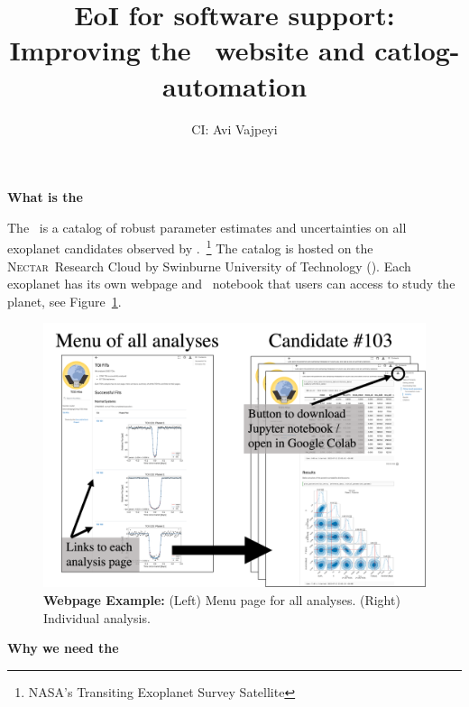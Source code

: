 \documentclass[floatfix,onecolumn]{aastex631}
\newcommand{\nectar}{\textsc{Nectar}}
\begin{document}
\title{\large\textbf{EoI for software support}:\\Improving the \tessAtlas\ website and catlog-automation}
 

\author{CI: Avi Vajpeyi}
\affiliation{\SPA}

\section*{}
\large{\textbf{What is the \tessAtlas}}\hfill\vspace{0.3em}

The \tessAtlas\ is a catalog of robust parameter estimates and uncertainties on all exoplanet candidates observed by \tess.~\footnote{NASA's Transiting Exoplanet Survey Satellite}
The catalog is hosted on the \nectar\ Research Cloud by Swinburne University of Technology (\atlasUrl). Each exoplanet has its own webpage and \jupyter\ notebook that users can access to study the planet, see Figure~\ref{fig:demo}.

\begin{figure}
    \includegraphics[width=\linewidth]{figures/notebooks_screenshot.png}
    \caption{\textbf{Webpage Example:} (Left) Menu page for all analyses. (Right) Individual analysis.}
    \label{fig:demo}
\end{figure}



\vspace{1em}


\large{\textbf{Why we need the \tessAtlas}}\hfill\vspace{0.3em}
\end{document}
